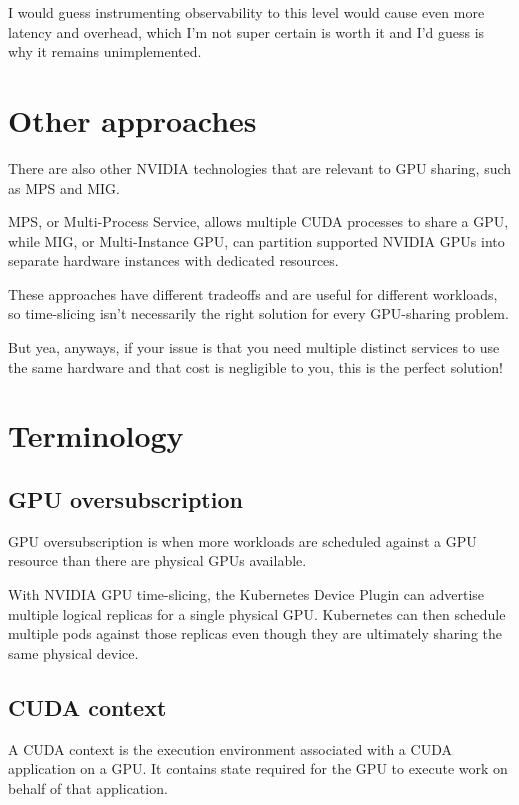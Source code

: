 I would guess instrumenting observability to this level would cause even more latency and overhead, which I'm not super certain is worth it and I'd guess is why it remains unimplemented.

\section{Other approaches}

There are also other NVIDIA technologies that are relevant to GPU sharing, such as MPS and MIG.

MPS, or Multi-Process Service, allows multiple CUDA processes to share a GPU, while MIG, or Multi-Instance GPU, can partition supported NVIDIA GPUs into separate hardware instances with dedicated resources.

These approaches have different tradeoffs and are useful for different workloads, so time-slicing isn't necessarily the right solution for every GPU-sharing problem.

But yea, anyways, if your issue is that you need multiple distinct services to use the same hardware and that cost is negligible to you, this is the perfect solution!

\section{Terminology}

\subsection{GPU oversubscription}

GPU oversubscription is when more workloads are scheduled against a GPU resource than there are physical GPUs available.

With NVIDIA GPU time-slicing, the Kubernetes Device Plugin can advertise multiple logical replicas for a single physical GPU. Kubernetes can then schedule multiple pods against those replicas even though they are ultimately sharing the same physical device.

\subsection{CUDA context}

A CUDA context is the execution environment associated with a CUDA application on a GPU. It contains state required for the GPU to execute work on behalf of that application.


